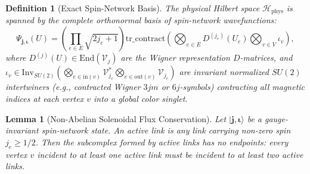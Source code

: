 \documentclass[11pt,reqno]{article}
\newtheorem{lemma}[theorem]{Lemma}
\newtheorem{definition}[theorem]{Definition}
\begin{document}
\begin{definition}[Exact Spin-Network Basis]
\label{def:exact_spin_network_basis}
The physical Hilbert space $\mathcal{H}_{\mathrm{phys}}$ is spanned by the complete orthonormal basis of spin-network wavefunctions:
\begin{equation}
    \label{eq:spin_network_basis_def}
    \Psi_{\mathbf{j}, \bm{\iota}}(U) = \left( \prod_{e \in E} \sqrt{2j_e + 1} \right) \mathrm{tr\_contract} \left( \bigotimes_{e \in E} D^{(j_e)}(U_e) \bigotimes_{v \in V} \iota_v \right),
\end{equation}
where $D^{(j)}(U) \in \mathrm{End}(\mathcal{V}_j)$ are the Wigner representation $D$-matrices, and $\iota_v \in \mathrm{Inv}_{SU(2)}\left( \bigotimes_{e \in \mathrm{in}(v)} \mathcal{V}_{j_e}^* \bigotimes_{e \in \mathrm{out}(v)} \mathcal{V}_{j_e} \right)$ are invariant normalized $SU(2)$ intertwiners (e.g., contracted Wigner $3jm$ or $6j$-symbols) contracting all magnetic indices at each vertex $v$ into a global color singlet.
\end{definition}

\begin{lemma}[Non-Abelian Solenoidal Flux Conservation]
\label{lem:solenoidal}
Let $|\mathbf{j}, \bm{\iota}\rangle$ be a gauge-invariant spin-network state. An active link is any link carrying non-zero spin $j_e \ge 1/2$.
Then the subcomplex formed by active links has no endpoints: every vertex $v$ incident to at least one active link must be incident to at least two active links.
\end{lemma}
\end{document}
